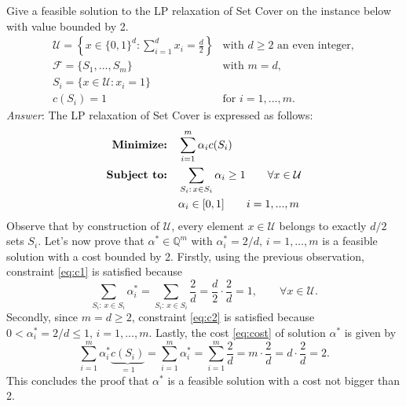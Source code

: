\documentclass[10pt]{article}
\newenvironment{exercise}[2][Exercise]{\begin{trivlist}
  \item[\hskip \labelsep {\bfseries #1}\hskip \labelsep {\bfseries #2.}]}{\end{trivlist}}
\begin{document}
 
  \newpage
  \begin{exercise}{4a}
 Give a feasible solution to the LP relaxation of Set Cover on the instance below with value bounded by 2.
  \begin{equation}  \label{eq:instance} \begin{array}{rl}
  \mathcal{U} = \left\{ x \in \{0,1\}^d : \sum_{i=1}^dx_i=\frac{d}{2}\right\} &  \mbox{with } d \geq 2 \mbox{ an even integer}, \\
  \mathcal{F} = \{S_1, ..., S_m\} &  \mbox{with } m=d, \\
 S_i = \{x \in \mathcal{U} : x_i = 1 \} \\ c(S_i)=1 & \mbox{for } i=1,...,m.
 \end{array} 
\end{equation}
  \emph{Answer}: The LP relaxation of Set Cover is expressed as follows:
 \begin{align}
 \mbox{\textbf{Minimize:}} \quad &  \sum_{i=1}^m \alpha_i c(S_i) \label{eq:cost} \\
 \mbox{\textbf{Subject to:}} \quad & \sum_{S_i : \, x \in S_i} \alpha_i \geq 1 \qquad \forall x \in \mathcal{U} \label{eq:c1} \\
 & \alpha_i \in [0, 1] \qquad i = 1,...,m \label{eq:c2}
 \end{align}
  Observe that by construction of $\mathcal{U}$, every element $x \in \mathcal{U}$ belongs to exactly $d/2$ sets $S_i$.   Let's now prove that $\alpha^* \in \mathbb{Q}^m$ with $\alpha^*_i = 2/d, \, i=1,\ldots,m$ is a feasible solution with a cost bounded by 2.
Firstly, using the previous observation, constraint \eqref{eq:c1} is satisfied because
  \begin{equation}
  \sum_{S_i : \, x \in S_i} \alpha^*_i = \sum_{S_i : \, x \in S_i} \frac{2}{d} = \frac{d}{2}\cdot\frac{2}{d}=1, \qquad \forall x \in \mathcal{U}.
  \end{equation}
Secondly, since $m=d \geq 2$, constraint \eqref{eq:c2} is satisfied because $0 < \alpha^*_i = 2/d \leq 1, \, i = 1,...,m$.
Lastly, the cost \eqref{eq:cost} of solution $\alpha^*$ is given by
  \begin{equation}
  \label{eq:OPTLP_ub}
  \sum_{i=1}^m \alpha_i^* \underbrace{c(S_i)}_{=1} =  \sum_{i=1}^m \alpha_i^* =  \sum_{i=1}^m \frac{2}{d} = m \cdot \frac{2}{d} = d \cdot \frac{2}{d} = 2.
  \end{equation}
  This concludes the proof that $\alpha^*$ is a feasible solution with a cost not bigger than 2.
  \end{exercise}
\end{document}
